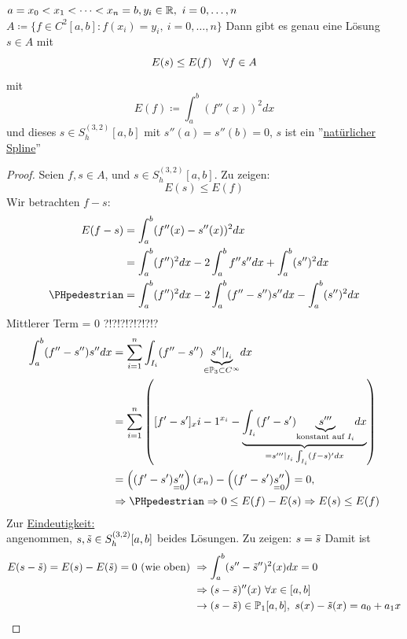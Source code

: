 \begin{theorem}
    \(a=x_0<x_1<\dots<x_n=b, y_i \in \mathbb{R} , \ i=0,\dots,n\)\\
    \(A\coloneqq \{ f\in C^2[a,b]\colon f(x_i)=y_i, \ i=0,\dots,n\}\)
    Dann gibt es genau eine Lösung $s\in A$ mit \[
        E(s) \leq E(f)\hspace{1em} \forall f\in A
    \] mit \[
        E(f) \coloneqq \int_a^b (f''(x))^2 dx
    \]
    und dieses \(s\in S^{(3,2)}_h[a,b]\) mit $s''(a)=s''(b)=0$, $s$ ist ein ''\underline{natürlicher Spline}''
    
\end{theorem}
\begin{proof}
    Seien $f,s\in A$, und $s\in S^{(3,2)}_h[a,b]$. Zu zeigen:\[
        E(s) \leq E(f)
    \]
    Wir betrachten $f-s$: \begin{align*}
        E(f-s) &= \int_a^b (f''(x) - s''(x))^2 dx\\
               &= \int_a^b (f'')^2 dx  - 2 \int_a^b f''s'' dx + \int_a^b (s'')^2 dx\\
              \text{\PHpedestrian} &= \int_a^b (f'')^2 dx - 2 \int_a^b(f'' - s'')s'' dx - \int_a^b (s'')^2 dx
    \end{align*}
    Mittlerer Term = 0 ?!?!?!?!?!?!?\begin{align*}
        \int_a^b(f'' - s'') s'' dx &= \dsum_{i=1}^n \int_{I_i}(f'' - s'')\underset{\in \bbP_3 \subset C^\infty}
        {\underbrace{s''\vert_{I_i}}} dx\\
        &= \dsum_{i=1}^n\left([f'-s']_x{i-1}^{x_i} - \underset{=s'''\vert_{I_i} \int_{I_i}(f-s)'dx}{\underbrace{\int_{I_i}
        (f'-s')\underset{\text{konstant auf $I_i$}}
        {\underbrace{s'''}} dx}}\right)\\
        &=\left((f'-s')\underset{=0}{s''}\right)(x_n)-\left((f'-s')\underset{=0}{s''}\right)=0, \\ &\Rightarrow 
        \text{\PHpedestrian} \Rightarrow 0\leq E(f)-E(s) \Rightarrow E(s)\leq E(f)
    \end{align*}
    Zur \underline{Eindeutigkeit:}\\
   \newcommand{\Ts}{\Tilde{s}}
    angenommen, $s,\Tilde{s} \in S^{(3,2)}_h[a,b]$ beides Lösungen. Zu zeigen: 
        $s=\Tilde{s}$
    Damit ist 
    \begin{align*}
        E(s-\Tilde{s})= E(s)-E(\Tilde{s})=0\text{ (wie oben) } &\Rightarrow \int_a^b(s''-\Ts'')^2(x)dx = 0 \\
        &\Rightarrow (s-\Ts)''(x)\ \forall x\in [a,b]\\
        &\rightarrow (s-\Ts)\in\bbP_1[a,b], \ s(x)-\Ts(x)=a_0+a_1x\\

\end{align*}
\end{proof}
